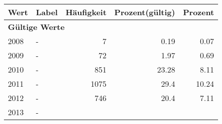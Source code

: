      \begin{longtable}{lXrrr}
     \toprule
     \textbf{Wert} & \textbf{Label} & \textbf{Häufigkeit} & \textbf{Prozent(gültig)} & \textbf{Prozent} \\
     \endhead
     \midrule
     \multicolumn{5}{l}{\textbf{Gültige Werte}}\\

     2008 &
     \multicolumn{1}{X}{ -  } &


       \num{7} &
       \num[round-mode=places,round-precision=2]{0.19} &
         \num[round-mode=places,round-precision=2]{0.07} \\

     2009 &
     \multicolumn{1}{X}{ -  } &


       \num{72} &
       \num[round-mode=places,round-precision=2]{1.97} &
         \num[round-mode=places,round-precision=2]{0.69} \\

     2010 &
     \multicolumn{1}{X}{ -  } &


       \num{851} &
       \num[round-mode=places,round-precision=2]{23.28} &
         \num[round-mode=places,round-precision=2]{8.11} \\

     2011 &
     \multicolumn{1}{X}{ -  } &


       \num{1075} &
       \num[round-mode=places,round-precision=2]{29.4} &
         \num[round-mode=places,round-precision=2]{10.24} \\

     2012 &
     \multicolumn{1}{X}{ -  } &


       \num{746} &
       \num[round-mode=places,round-precision=2]{20.4} &
         \num[round-mode=places,round-precision=2]{7.11} \\

     2013 &
     \multicolumn{1}{X}{ -  } &



\end{longtable}
